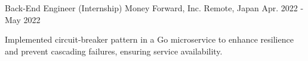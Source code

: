 \begin{cventries}
  \cventry
    {Back-End Engineer (Internship)} %
    {Money Forward, Inc.} %
    {Remote, Japan} %
    {Apr. 2022 - May 2022} %
    {
      \begin{cvjobdesc}
        Implemented circuit-breaker pattern in a Go microservice to enhance resilience and prevent cascading failures, ensuring service availability.
      \end{cvjobdesc}
    }



\end{cventries}

